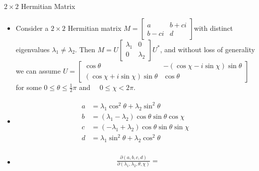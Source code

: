 \documentclass[UTF8,AutoFakeBold,AutoFakeSlant]{beamer}
\begin{document}
\begin{frame}{$2\times 2$ Hermitian Matrix}
    \begin{itemize}
        \tiny
        \item Consider a $2\times 2$ Hermitian matrix $M=\begin{bmatrix}a & b+ci \\b-ci & d\end{bmatrix}$with distinct eigenvalues $\lambda_1\neq\lambda_2$. Then $M=U\begin{bmatrix}\lambda_1&0\\0&\lambda_2\end{bmatrix}U^*$, and without loss of generality we can assume $U=\begin{bmatrix}\cos\theta & -\left(\cos\chi-i\sin\chi\right)\sin\theta\\ \left(\cos\chi+i\sin\chi\right)\sin\theta & \cos\theta\end{bmatrix}$ for some $0\leq\theta\leq\frac12\pi$ and $\quad0\leq\chi<2\pi$.
        \item \begin{align*}
                  \begin{split}
                      a & =\lambda_1\cos^2\theta+\lambda_2\sin^2\theta                   \\
                      b & =\left(\lambda_1-\lambda_2\right)\cos\theta\sin\theta\cos\chi  \\
                      c & =\left(-\lambda_1+\lambda_2\right)\cos\theta\sin\theta\sin\chi \\
                      d & =\lambda_{1}\sin^{2}\theta+\lambda_{2}\cos^{2}\theta
                  \end{split}
              \end{align*}
        \item
              \begin{align*}
                  \begin{split}
                       & \frac{\partial(a,b,c,d)}{\partial(\lambda_1,\lambda_2,\theta,\chi)}=                                                                                                                                                                                                                                                                                                                                                                                                                                                                                                                                                                                                                          \\

\end{split}
\end{align*}
\end{itemize}
\end{frame}
\end{document}
